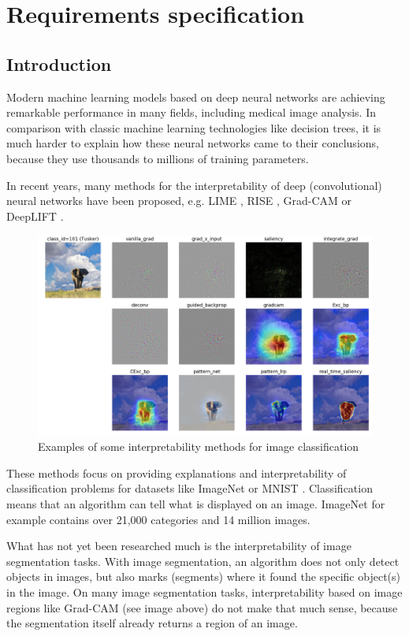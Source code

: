 \chapter{Requirements specification}
\section{Introduction}
Modern machine learning models based on deep neural networks are achieving remarkable performance in many fields, including medical image analysis. In comparison with classic machine learning technologies like decision trees, it is much harder to explain how these neural networks came to their conclusions, because they use thousands to millions of training parameters.

In recent years, many methods for the interpretability of deep (convolutional) neural networks have been proposed, e.g. LIME \cite{ribeiro2016should}, RISE \cite{Petsiuk2018rise}, Grad-CAM \cite{selvaraju2017grad} or DeepLIFT \cite{shrikumar2017learning}.

\begin{figure}[h]
\centering
\caption{Examples of some interpretability methods for image classification \cite{visualattribution}}
\includegraphics[width=14cm]{images/tusker_saliency.png}
\end{figure}

These methods focus on providing explanations and interpretability of classification problems for datasets like ImageNet \cite{imagenet_cvpr09} or MNIST \cite{lecun-mnisthandwrittendigit-2010}. Classification means that an algorithm can tell what is displayed on an image. ImageNet for example contains over 21,000 categories and 14 million images.

What has not yet been researched much is the interpretability of image segmentation tasks. With image segmentation, an algorithm does not only detect objects in images, but also marks (segments) where it found the specific object(s) in the image. On many image segmentation tasks, interpretability based on image regions like Grad-CAM (see image above) do not make that much sense, because the segmentation itself already returns a region of an image.

